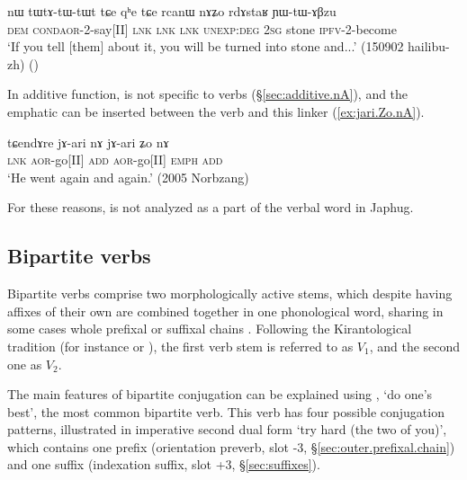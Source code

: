 \begin{exe}
\ex \label{ex:tWtAtWtWt.tCe}
\gll nɯ tɯ\redp{}tɤ-tɯ-tɯt tɕe qʰe tɕe rcanɯ nɤʑo rdɤstaʁ ɲɯ-tɯ-ɤβzu \\
\textsc{dem} \textsc{cond}\redp{}\textsc{aor}-2-say[II] \textsc{lnk} \textsc{lnk} \textsc{lnk} \textsc{unexp}:\textsc{deg} \textsc{2sg} stone \textsc{ipfv}-2-become \\
\glt `If you tell [them] about it, you will be turned into stone and...' (150902 hailibu-zh)
()
\end{exe}

In additive function,  is not specific to verbs (§\ref{sec:additive.nA}), and the emphatic  can be inserted between the verb and this linker (\ref{ex:jari.Zo.nA}).

\begin{exe}
\ex \label{ex:jari.Zo.nA}
\gll tɕendɤre jɤ-ari nɤ jɤ-ari ʑo nɤ \\
\textsc{lnk} \textsc{aor}-go[II] \textsc{add} \textsc{aor}-go[II] \textsc{emph} \textsc{add} \\
\glt `He went again and again.' (2005 Norbzang)
\end{exe}

For these reasons,  is not analyzed as a part of the verbal word in Japhug.

\subsection{Bipartite verbs} \label{sec:bipartite}
Bipartite verbs comprise two morphologically active stems, which despite having affixes of their own are combined together in one phonological word, sharing in some cases whole prefixal or suffixal chains \citep{jacques18bipartite}. Following the Kirantological tradition (for instance \citealt{doornenbal09} or \citealt{schackow15yakkha}), the first verb stem is referred to as $V_1$, and the second one as $V_2$.

The main features of bipartite conjugation can be explained using  , `do one's best', the most common bipartite verb. This verb has four possible conjugation patterns, illustrated in  imperative second dual form `try hard (the two of you)', which contains one prefix (orientation preverb, slot -3, §\ref{sec:outer.prefixal.chain}) and one suffix (indexation suffix, slot +3, §\ref{sec:suffixes}).
 
